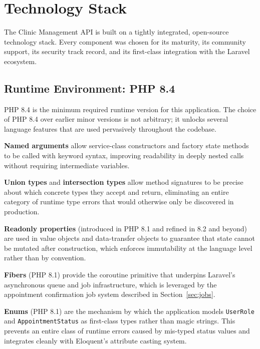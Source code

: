 \section{Technology Stack}
\label{sec:tech-stack}

The Clinic Management API is built on a tightly integrated, open-source
technology stack. Every component was chosen for its maturity, its
community support, its security track record, and its first-class
integration with the Laravel ecosystem.

\subsection{Runtime Environment: PHP 8.4}

PHP 8.4 is the minimum required runtime version for this application. The
choice of PHP 8.4 over earlier minor versions is not arbitrary; it
unlocks several language features that are used pervasively throughout
the codebase.

\textbf{Named arguments} allow service-class constructors and factory
state methods to be called with keyword syntax, improving readability in
deeply nested calls without requiring intermediate variables.

\textbf{Union types} and \textbf{intersection types} allow method
signatures to be precise about which concrete types they accept and
return, eliminating an entire category of runtime type errors that would
otherwise only be discovered in production.

\textbf{Readonly properties} (introduced in PHP 8.1 and refined in 8.2
and beyond) are used in value objects and data-transfer objects to
guarantee that state cannot be mutated after construction, which enforces
immutability at the language level rather than by convention.

\textbf{Fibers} (PHP 8.1) provide the coroutine primitive that underpins
Laravel's asynchronous queue and job infrastructure, which is leveraged by
the appointment confirmation job system described in
Section~\ref{sec:jobs}.

\textbf{Enums} (PHP 8.1) are the mechanism by which the application
models \texttt{UserRole} and \texttt{AppointmentStatus} as first-class
types rather than magic strings. This prevents an entire class of
runtime errors caused by mis-typed status values and integrates cleanly
with Eloquent's attribute casting system.

